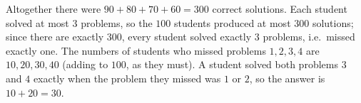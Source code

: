 Altogether there were $90+80+70+60=300$ correct solutions. Each student solved at most $3$ problems, so the $100$ students produced at most $300$ solutions; since there are exactly $300$, every student solved exactly $3$ problems, i.e.\ missed exactly one. The numbers of students who missed problems $1,2,3,4$ are $10,20,30,40$ (adding to $100$, as they must). A student solved both problems $3$ and $4$ exactly when the problem they missed was $1$ or $2$, so the answer is $10+20=\boxed{30}$.
